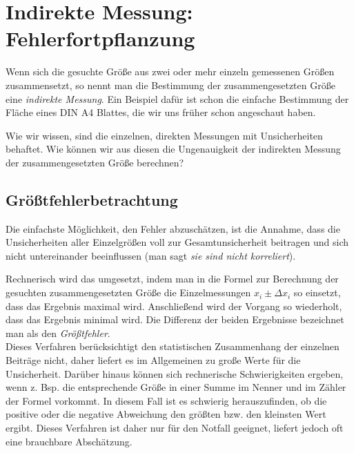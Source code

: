 \section{Indirekte Messung: Fehlerfortpflanzung}

Wenn sich die gesuchte Größe aus zwei oder mehr einzeln gemessenen Größen zusammensetzt, so nennt man die Bestimmung der zusammengesetzten Größe eine \textit{indirekte Messung}. Ein Beispiel dafür ist schon die einfache Bestimmung der Fläche eines DIN A4 Blattes, die wir uns früher schon angeschaut haben.

Wie wir wissen, sind die einzelnen, direkten Messungen mit Unsicherheiten behaftet. Wie können wir aus diesen die Ungenauigkeit der indirekten Messung der zusammengesetzten Größe berechnen?

\subsection{Größtfehlerbetrachtung}

Die einfachste Möglichkeit, den Fehler abzuschätzen, ist die Annahme, dass die Unsicherheiten aller Einzelgrößen voll zur Gesamtunsicherheit beitragen und sich nicht untereinander beeinflussen (man sagt \textit{sie sind nicht korreliert}).

Rechnerisch wird das umgesetzt, indem man in die Formel zur Berechnung der gesuchten zusammengesetzten Größe die Einzelmessungen $x_i \pm \Delta x_i$ so einsetzt, dass das Ergebnis maximal wird. Anschließend wird der Vorgang so wiederholt, dass das Ergebnis minimal wird. Die Differenz der beiden Ergebnisse bezeichnet man als den \textit{Größtfehler}.\\

Dieses Verfahren berücksichtigt den statistischen Zusammenhang der einzelnen Beiträge nicht, daher liefert es im Allgemeinen zu große Werte für die Unsicherheit. Darüber hinaus können sich rechnerische Schwierigkeiten ergeben, wenn z. Bsp. die entsprechende Größe in einer Summe im Nenner und im Zähler der Formel vorkommt. In diesem Fall ist es schwierig herauszufinden, ob die positive oder die negative Abweichung den größten bzw. den kleinsten Wert ergibt. Dieses Verfahren ist daher nur für den Notfall geeignet, liefert jedoch oft eine brauchbare Abschätzung.

